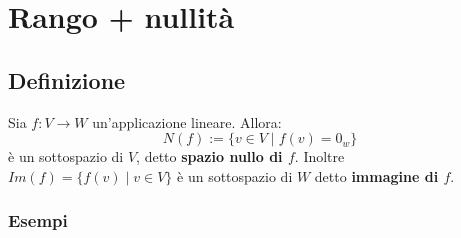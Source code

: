 \documentclass[a4paper]{article}
\theoremstyle{break}
\theoremstyle{break}
\theoremstyle{break}
\theoremstyle{break}
\begin{document}
\section{Rango + nullità}
\label{8}
\subsection{Definizione}
Sia \( f: V \to W \) un'applicazione lineare. Allora:
\[
N(f) := \{v \in V \;|\; f(v) = 0_w\} 
\] 
è un sottospazio di \( V \), detto \textbf{spazio nullo di \( f \)}. Inoltre \( Im(f) =
\{f(v) \;|\; v \in V\} \) è un sottospazio di \( W \) detto \textbf{immagine di \( f \)}.

\subsubsection{Esempi}
\end{document}
